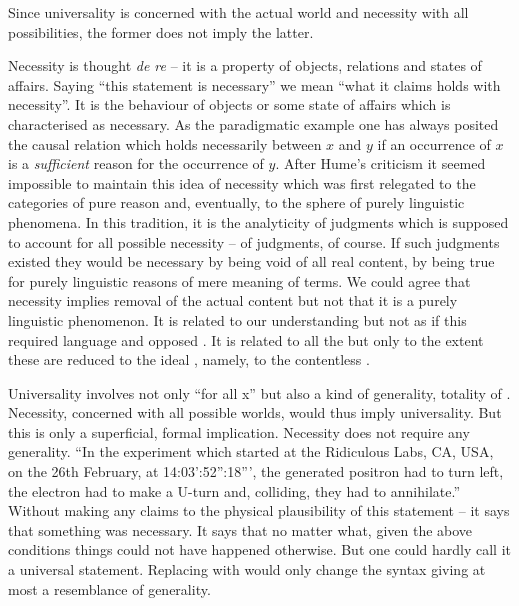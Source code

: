 Since universality is concerned with the actual world and necessity
with all possibilities, the former does not imply the latter. 

Necessity is thought {\em de re} -- it is a property of objects,
relations and states of affairs.  Saying ``this statement is necessary'' we mean
``what it claims holds with necessity''.  It is the behaviour of objects or some
state of affairs which is characterised as necessary. As the paradigmatic
example one has always posited the causal relation which holds necessarily
between $x$ and $y$ if an occurrence of $x$ is a {\em sufficient} reason for the
occurrence of $y$.  After Hume's criticism it seemed impossible to maintain this
idea of necessity which was first relegated to the categories of pure reason
and, eventually, to the sphere of purely linguistic phenomena.  In
this tradition, it is the analyticity of judgments which is supposed to account
for all possible necessity -- of judgments, of course. If such judgments existed
they would be necessary by being void of all real content, by being true for
purely linguistic reasons of mere meaning of terms.  We could agree that
necessity implies removal of the actual content but not that it is a purely
linguistic phenomenon.  It is related to our understanding but not as if this
required language and opposed .  It is related to all the
 but only to the extent these are reduced to the ideal
, namely, to the contentless .

\pa Universality involves not only ``for all x'' but also a kind of
generality, totality of . Necessity, concerned with all 
possible worlds, would thus imply universality. But this is only a 
superficial, formal implication. Necessity does not require any generality.  
``In the experiment which
started at the Ridiculous Labs, CA, USA, on the 26th February, at
14:03':52'':18''', the generated positron had to turn left,
the electron had to make a U-turn and, colliding, they had to annihilate.'' 
Without making any claims to the physical plausibility of this
statement -- it says that something was necessary.  It says that no
matter what, given the above conditions things could not have happened
otherwise.  But one could hardly call it a universal statement. 
Replacing  with  would only change the
syntax giving at most a resemblance of generality. 

